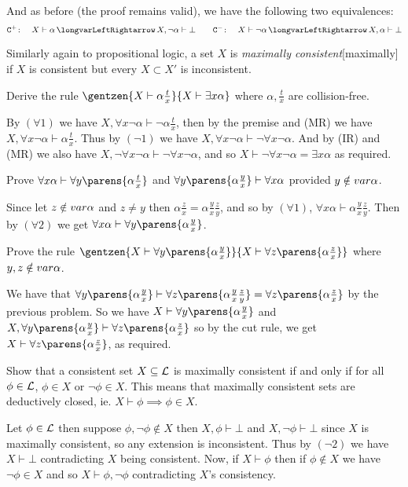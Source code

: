 And as before (the proof remains valid), we have the following two equivalences:
$$ {\tt C}^+\colon\quad X\vdash\alpha \iff X,\neg\alpha\vdash\bot\qquad {\tt C}^-\colon\quad X\vdash\neg\alpha\iff X,\alpha\vdash\bot $$

Similarly again to propositional logic, a set $X$ is {\it maximally consistent}[maximally] if $X$ is consistent but every $X\subset X'$ is inconsistent.

\bexerc

    Derive the rule $\gentzen{X\vdash\alpha\frac tx}{X\vdash\exists x\alpha}$ where $\alpha,\frac tx$ are collision-free.

\eexerc

By $(\forall1)$ we have $X,\forall x\neg\alpha\vdash\neg\alpha\frac tx$, then by the premise and (MR) we have $X,\forall x\neg\alpha\vdash\alpha\frac tx$.
Thus by $(\neg1)$ we have $X,\forall x\neg\alpha\vdash\neg\forall x\neg\alpha$.
And by (IR) and (MR) we also have $X,\neg\forall x\neg\alpha\vdash\neg\forall x\neg\alpha$, and so $X\vdash\neg\forall x\neg\alpha=\exists x\alpha$ as required.

\bexerc

    Prove $\forall x\alpha\vdash\forall y\parens{\alpha\frac tx}$ and $\forall y\parens{\alpha\frac yx}\vdash\forall x\alpha$ provided $y\notin{\sl var}\alpha$.

\eexerc

Since let $z\notin{\sl var}\alpha$ and $z\neq y$ then $\alpha\frac zx=\alpha\frac yx\frac zy$, and so by $(\forall1)$, $\forall x\alpha\vdash\alpha\frac yx\frac zy$.
Then by $(\forall2)$ we get $\forall x\alpha\vdash\forall y\parens{\alpha\frac yx}$.

\bexerc

    Prove the rule $\gentzen{X\vdash\forall y\parens{\alpha\frac yx}}{X\vdash\forall z\parens{\alpha\frac zx}}$ where $y,z\notin{\sl var}\alpha$.

\eexerc

We have that $\forall y\parens{\alpha\frac yx}\vdash\forall z\parens{\alpha\frac yx\frac zy}=\forall z\parens{\alpha\frac zx}$ by the previous problem.
So we have $X\vdash\forall y\parens{\alpha\frac yx}$ and $X,\forall y\parens{\alpha\frac yx}\vdash\forall z\parens{\alpha\frac zx}$ so by the cut rule, we get $X\vdash\forall z\parens{\alpha\frac zx}$,
as required.

\bexerc

    Show that a consistent set $X\subseteq{\cal L}$ is maximally consistent if and only if for all $\phi\in{\cal L}$, $\phi\in X$ or $\neg\phi\in X$.
    This means that maximally consistent sets are deductively closed, ie. $X\vdash\phi\implies\phi\in X$.

\eexerc

Let $\phi\in{\cal L}$ then suppose $\phi,\neg\phi\notin X$ then $X,\phi\vdash\bot$ and $X,\neg\phi\vdash\bot$ since $X$ is maximally consistent, so any extension is inconsistent.
Thus by $(\neg2)$ we have $X\vdash\bot$ contradicting $X$ being consistent.
Now, if $X\vdash\phi$ then if $\phi\notin X$ we have $\neg\phi\in X$ and so $X\vdash\phi,\neg\phi$ contradicting $X$'s consistency.

